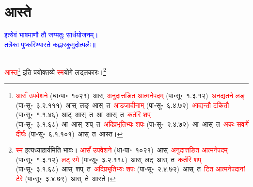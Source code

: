 \section[आस्ते]{आस्ते}
\centering\textcolor{blue}{इत्येवं भाषमाणौ तौ जग्मतुः सार्धयोजनम्।\nopagebreak\\
तत्रैका पुष्करिण्यास्ते कह्लारकुमुदोत्पलैः॥}\nopagebreak\\
\\
\fontsize{14}{21}\selectfont\begin{sloppypar}\justifying\noindent\hspace{10mm} \textcolor{red}{आस्त}\footnote{\textcolor{red}{आसँ उपवेशने} (धा॰पा॰~१०२१)~\arrow आस्~\arrow \textcolor{red}{अनुदात्तङित आत्मने\-पदम्} (पा॰सू॰~१.३.१२)~\arrow \textcolor{red}{अनद्यतने लङ्} (पा॰सू॰~३.२.१११)~\arrow आस्~लङ्~\arrow आस्~त~\arrow \textcolor{red}{आडजादीनाम्} (पा॰सू॰~६.४.७२)~\arrow \textcolor{red}{आद्यन्तौ टकितौ} (पा॰सू॰~१.१.४६)~\arrow आट्~आस्~त~\arrow आ~आस्~त~\arrow \textcolor{red}{कर्तरि शप्‌} (पा॰सू॰~३.१.६८)~\arrow आ~आस्~शप्~त~\arrow \textcolor{red}{अदिप्रभृतिभ्यः शपः} (पा॰सू॰~२.४.७२)~\arrow आ~आस्~त~\arrow \textcolor{red}{अकः सवर्णे दीर्घः} (पा॰सू॰~६.१.१०१)~\arrow आस्~त~\arrow आस्त।
} इति प्रयोक्तव्ये \textcolor{red}{स्म}\-योगे लड्लकारः।\footnote{\textcolor{red}{स्म} इत्यध्याहार्यमिति भावः। \textcolor{red}{आसँ उपवेशने} (धा॰पा॰~१०२१)~\arrow आस्~\arrow \textcolor{red}{अनुदात्तङित आत्मने\-पदम्} (पा॰सू॰~१.३.१२)~\arrow \textcolor{red}{लट् स्मे} (पा॰सू॰~३.२.११८)~\arrow आस्~लट्~\arrow आस्~त~\arrow \textcolor{red}{कर्तरि शप्‌} (पा॰सू॰~३.१.६८)~\arrow आस्~शप्~त~\arrow \textcolor{red}{अदिप्रभृतिभ्यः शपः} (पा॰सू॰~२.४.७२)~\arrow आस्~त~\arrow \textcolor{red}{टित आत्मनेपदानां टेरे} (पा॰सू॰~३.४.७९)~\arrow आस्~ते~\arrow आस्ते।
}\end{sloppypar}
